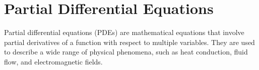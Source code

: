 \chapter{Partial Differential Equations}

Partial differential equations (PDEs) are mathematical equations that involve partial derivatives of a function with respect to multiple variables. They are used to describe a wide range of physical phenomena, such as heat conduction, fluid flow, and electromagnetic fields.